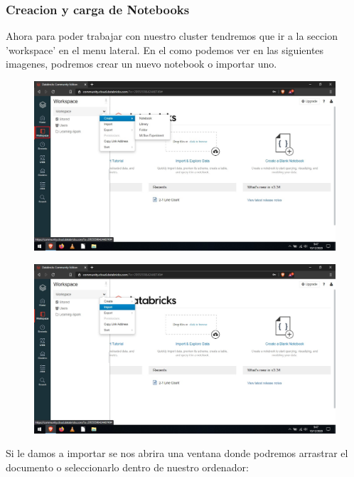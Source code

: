 \documentclass[a4paper,10pt]{article}
\begin{document}
\subsubsection{Creacion y carga de Notebooks}

Ahora para poder trabajar con nuestro cluster tendremos que ir a la seccion 'workspace'  en el menu lateral. En el como podemos ver en las siguientes imagenes, podremos crear un nuevo notebook o importar uno.

\begin{figure}[H]
\begin{center}
\includegraphics[width=500pt]{./fotos/Databricks/11 - Databricks (V).jpg}
\end{center}
\end{figure}

\begin{figure}[H]
\begin{center}
\includegraphics[width=500pt]{./fotos/Databricks/10 - Databricks.jpg}
\end{center}
\end{figure}

Si le damos a importar se nos abrira una ventana donde podremos arrastrar el documento o seleccionarlo dentro de nuestro ordenador:
\end{document}
